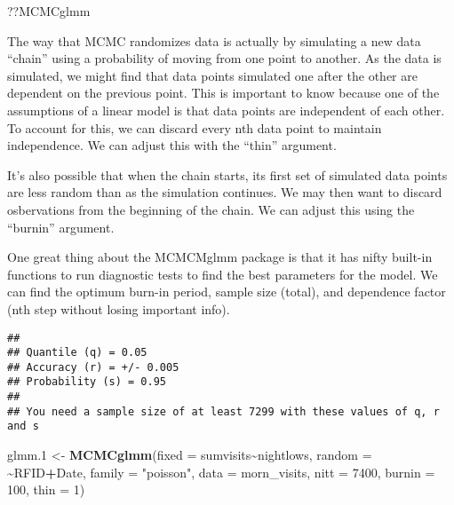 \documentclass[
]{article}
\newenvironment{Shaded}{\begin{snugshade}}{\end{snugshade}}
\newcommand{\AttributeTok}[1]{\textcolor[rgb]{0.13,0.29,0.53}{#1}}
\newcommand{\DecValTok}[1]{\textcolor[rgb]{0.00,0.00,0.81}{#1}}
\newcommand{\FloatTok}[1]{\textcolor[rgb]{0.00,0.00,0.81}{#1}}
\newcommand{\FunctionTok}[1]{\textcolor[rgb]{0.13,0.29,0.53}{\textbf{#1}}}
\newcommand{\NormalTok}[1]{#1}
\newcommand{\OtherTok}[1]{\textcolor[rgb]{0.56,0.35,0.01}{#1}}
\newcommand{\SpecialCharTok}[1]{\textcolor[rgb]{0.81,0.36,0.00}{\textbf{#1}}}
\newcommand{\StringTok}[1]{\textcolor[rgb]{0.31,0.60,0.02}{#1}}
\begin{document}
\begin{Shaded}
\begin{Highlighting}[]
\NormalTok{??MCMCglmm}
\end{Highlighting}
\end{Shaded}

The way that MCMC randomizes data is actually by simulating a new data
``chain'' using a probability of moving from one point to another. As
the data is simulated, we might find that data points simulated one
after the other are dependent on the previous point. This is important
to know because one of the assumptions of a linear model is that data
points are independent of each other. To account for this, we can
discard every nth data point to maintain independence. We can adjust
this with the ``thin'' argument.

It's also possible that when the chain starts, its first set of
simulated data points are less random than as the simulation continues.
We may then want to discard osbervations from the beginning of the
chain. We can adjust this using the ``burnin'' argument.

One great thing about the MCMCMglmm package is that it has nifty
built-in functions to run diagnostic tests to find the best parameters
for the model. We can find the optimum burn-in period, sample size
(total), and dependence factor (nth step without losing important info).

\begin{Shaded}
\end{Shaded}

\begin{verbatim}
## 
## Quantile (q) = 0.05
## Accuracy (r) = +/- 0.005
## Probability (s) = 0.95 
## 
## You need a sample size of at least 7299 with these values of q, r and s
\end{verbatim}

\begin{Shaded}
\begin{Highlighting}[]
\NormalTok{glmm}\FloatTok{.1} \OtherTok{\textless{}{-}} \FunctionTok{MCMCglmm}\NormalTok{(}\AttributeTok{fixed =}\NormalTok{ sumvisits}\SpecialCharTok{\textasciitilde{}}\NormalTok{nightlows,}
                   \AttributeTok{random =} \SpecialCharTok{\textasciitilde{}}\NormalTok{RFID}\SpecialCharTok{+}\NormalTok{Date,}
                   \AttributeTok{family =} \StringTok{"poisson"}\NormalTok{,}
                   \AttributeTok{data =}\NormalTok{ morn\_visits, }
                   \AttributeTok{nitt =} \DecValTok{7400}\NormalTok{,}
                   \AttributeTok{burnin =} \DecValTok{100}\NormalTok{,}
                   \AttributeTok{thin =} \DecValTok{1}\NormalTok{)}
\end{Highlighting}
\end{Shaded}
\end{document}
